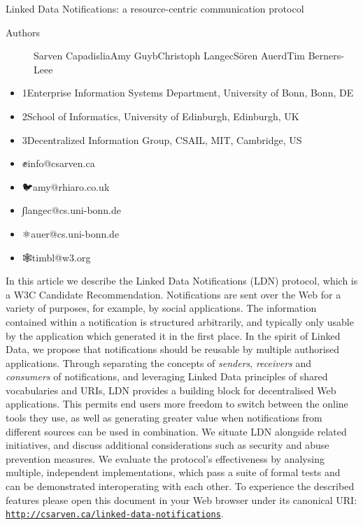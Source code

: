 \documentclass[a4paper]{llncs}
\begin{document}
                Linked Data Notifications: a resource-centric communication protocol


                    \begin{description}
  \item[Authors] \empty Sarven Capadisli\empty a\empty Amy Guy\empty b\empty Christoph Lange\empty c\empty Sören Auer\empty d\empty Tim Berners-Lee\empty e
    \end{description}


                    \begin{itemize}
  \item 1Enterprise Information Systems Department, \empty University of Bonn, Bonn, DE\item 2School of Informatics, \empty University of Edinburgh, Edinburgh, UK\item 3Decentralized Information Group, CSAIL, \empty MIT, Cambridge, US
    \end{itemize}


                    \begin{itemize}
  \item ✊\empty info@csarven.ca\item 🐦\empty amy@rhiaro.co.uk\item ∫\empty langec@cs.uni-bonn.de\item ⚛\empty auer@cs.uni-bonn.de\item 🕸\empty timbl@w3.org
    \end{itemize}








\par In this article we describe the Linked Data Notifications (LDN) protocol, which is a \empty W3C Candidate Recommendation. Notifications are sent over the Web for a variety of purposes, for example, by social applications. The information contained within a notification is structured arbitrarily, and typically only usable by the application which generated it in the first place. In the spirit of Linked Data, we propose that notifications should be reusable by multiple authorised applications. Through separating the concepts of {\em senders}, {\em receivers} and {\em consumers} of notifications, and leveraging Linked Data principles of shared vocabularies and URIs, LDN provides a building block for decentralised Web applications. This permits end users more freedom to switch between the online tools they use, as well as generating greater value when notifications from different sources can be used in combination. We situate LDN alongside related initiatives, and discuss additional considerations such as security and abuse prevention measures. We evaluate the protocol’s effectiveness by analysing multiple, independent implementations, which pass a suite of formal tests and can be demonstrated interoperating with each other. To experience the described features please open this document in your Web browser under its canonical URI: {\tt \href{http://csarven.ca/linked-data-notifications}{http://csarven.ca/linked-data-notifications}}.
\end{document}
